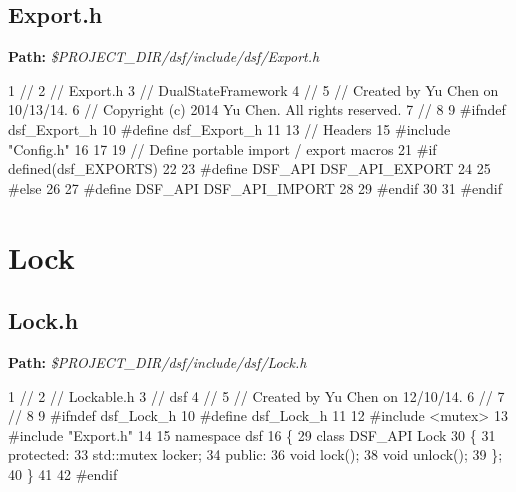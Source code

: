 \hypertarget{_dual_state_framework_DualStateFrameworkExport_h}{}\subsection{Export.\+h}\label{_dual_state_framework_DualStateFrameworkExport_h}
{\bfseries Path\+:} {\itshape \$\+P\+R\+O\+J\+E\+C\+T\+\_\+\+D\+I\+R/dsf/include/dsf/\+Export.h} 
\begin{DoxyCodeInclude}
1 \textcolor{comment}{//}
2 \textcolor{comment}{//  Export.h}
3 \textcolor{comment}{//  DualStateFramework}
4 \textcolor{comment}{//}
5 \textcolor{comment}{//  Created by Yu Chen on 10/13/14.}
6 \textcolor{comment}{//  Copyright (c) 2014 Yu Chen. All rights reserved.}
7 \textcolor{comment}{//}
8 
9 \textcolor{preprocessor}{#ifndef dsf\_Export\_h}
10 \textcolor{preprocessor}{#define dsf\_Export\_h}
11 
13 \textcolor{comment}{// Headers}
15 \textcolor{comment}{}\textcolor{preprocessor}{#include "Config.h"}
16 
17 
19 \textcolor{comment}{// Define portable import / export macros}
21 \textcolor{comment}{}\textcolor{preprocessor}{#if defined(dsf\_EXPORTS)}
22 
23 \textcolor{preprocessor}{#define DSF\_API DSF\_API\_EXPORT}
24 
25 \textcolor{preprocessor}{#else}
26 
27 \textcolor{preprocessor}{#define DSF\_API DSF\_API\_IMPORT}
28 
29 \textcolor{preprocessor}{#endif}
30 
31 \textcolor{preprocessor}{#endif}
\end{DoxyCodeInclude}
 \hypertarget{_dual_state_framework_DualStateFrameworkLock}{}\section{Lock}\label{_dual_state_framework_DualStateFrameworkLock}
\hypertarget{_dual_state_framework_DualStateFrameworkLock_h}{}\subsection{Lock.\+h}\label{_dual_state_framework_DualStateFrameworkLock_h}
{\bfseries Path\+:} {\itshape \$\+P\+R\+O\+J\+E\+C\+T\+\_\+\+D\+I\+R/dsf/include/dsf/\+Lock.h} 
\begin{DoxyCodeInclude}
1 \textcolor{comment}{//}
2 \textcolor{comment}{//  Lockable.h}
3 \textcolor{comment}{//  dsf}
4 \textcolor{comment}{//}
5 \textcolor{comment}{//  Created by Yu Chen on 12/10/14.}
6 \textcolor{comment}{//}
7 \textcolor{comment}{//}
8 
9 \textcolor{preprocessor}{#ifndef dsf\_Lock\_h}
10 \textcolor{preprocessor}{#define dsf\_Lock\_h}
11 
12 \textcolor{preprocessor}{#include <mutex>}
13 \textcolor{preprocessor}{#include "Export.h"}
14 
15 \textcolor{keyword}{namespace }dsf
16 \{
29     \textcolor{keyword}{class }DSF\_API Lock
30     \{
31     \textcolor{keyword}{protected}:
33         std::mutex locker;
34     \textcolor{keyword}{public}:
36         \textcolor{keywordtype}{void} lock();
38         \textcolor{keywordtype}{void} unlock();
39     \};
40 \}
41 
42 \textcolor{preprocessor}{#endif}
\end{DoxyCodeInclude}
